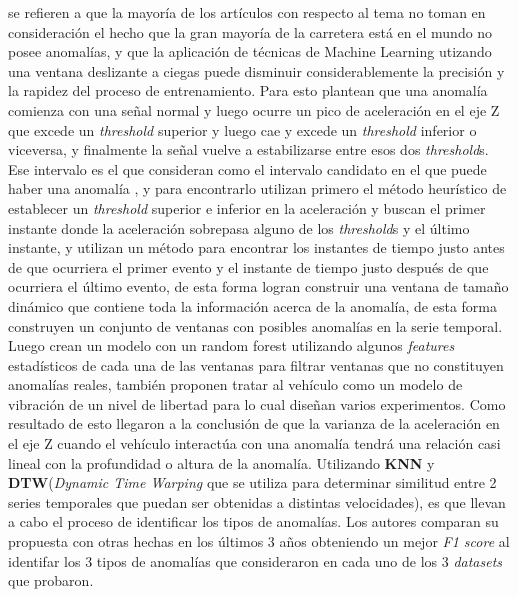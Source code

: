 \cite{zheng2020fused} se refieren a que la mayoría de los artículos con respecto al tema no toman en consideración el hecho que la gran mayoría de la
carretera está en el mundo no posee anomalías, y que la aplicación de técnicas de Machine Learning utizando una ventana deslizante a ciegas puede
disminuir considerablemente la precisión y la rapidez del proceso de entrenamiento. Para esto plantean que una anomalía comienza con una señal normal
y luego ocurre un pico de aceleración en el eje Z que excede un \emph{threshold} superior y luego cae y excede un \emph{threshold} inferior o viceversa,
y finalmente la señal vuelve a estabilizarse entre esos dos \emph{threshold}s. Ese intervalo es el que consideran como el intervalo candidato en el que
puede haber una anomalía , y para encontrarlo utilizan primero el método heurístico de establecer un \emph{threshold} superior e inferior en la aceleración
y buscan el primer instante donde la aceleración sobrepasa alguno de los \emph{threshold}s y el último instante, y utilizan un método para encontrar los
instantes de tiempo justo antes de que ocurriera el primer evento y el instante de tiempo justo después de que ocurriera el último evento, de esta forma
logran construir una ventana de tamaño dinámico que contiene toda la información acerca de la anomalía, de esta forma construyen un conjunto de ventanas
con posibles anomalías en la serie temporal. Luego crean un modelo con un random forest utilizando algunos \emph{features} estadísticos de cada una de las ventanas
para filtrar ventanas que no constituyen anomalías reales, también proponen tratar al vehículo como un modelo de vibración de un nivel de libertad para lo
cual diseñan varios experimentos. Como resultado de esto llegaron a la conclusión de que la varianza de la aceleración en el eje Z cuando el vehículo interactúa
con una anomalía tendrá una relación casi lineal con la profundidad o altura de la anomalía. Utilizando \textbf{KNN} y \textbf{DTW}(\emph{Dynamic Time Warping}
que se utiliza para determinar similitud entre 2 series temporales que puedan ser obtenidas a distintas velocidades), es que llevan a cabo el proceso
de identificar los tipos de anomalías. Los autores comparan su propuesta con otras hechas en los últimos 3 años obteniendo un mejor \emph{F1 score} al
identifar los 3 tipos de anomalías que consideraron en cada uno de los 3 \emph{datasets} que probaron.

